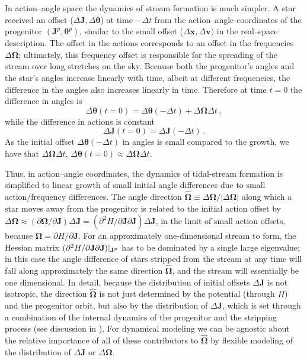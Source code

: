 \documentclass[12pt,preprint]{aastex}
\renewcommand{\vec}[1]{\ensuremath{\mathbf{#1}}}
\newcommand{\unitvec}[1]{\ensuremath{\mathbf{\hat{#1}}}}
\newcommand{\vecx}{\ensuremath{\vec{x}}}
\newcommand{\vecv}{\ensuremath{\vec{v}}}
\newcommand{\vecj}{\ensuremath{\vec{J}}}
\newcommand{\veco}{\ensuremath{\vec{\Omega}}}
\newcommand{\veca}{\ensuremath{\boldsymbol\theta}}
\begin{document}
In action--angle space the dynamics of stream formation is much
simpler. A star received an offset ($\Delta \vecj,\Delta \veca$) at
time $-\Delta t$ from the action--angle coordinates of the progenitor
$(\vecj^p,\veca^p)$, similar to the small offset ($\Delta \vecx,\Delta
\vecv)$ in the real--space description. The offset in the actions
corresponds to an offset in the frequencies $\Delta \veco$;
ultimately, this frequency offset is responsible for the spreading of
the stream over long stretches on the sky. Because both the
progenitor's angles and the star's angles increase linearly with time,
albeit at different frequencies, the difference in the angles also
increases linearly in time. Therefore at time $t=0$ the difference in
angles is
\begin{equation}
\Delta \veca(t=0) = \Delta \veca(-\Delta t) + \Delta \veco \Delta t\,,
\end{equation}
while the difference in actions is constant
\begin{equation}
\Delta \vecj(t=0) = \Delta \vecj(-\Delta t)\,.
\end{equation}
As the initial offset $\Delta \veca(-\Delta t)$ in angles is small
compared to the growth, we have that $\Delta\veco\Delta t$, $\Delta
\veca(t=0) \approx \Delta \veco \Delta t$.

Thus, in action--angle coordinates, the dynamics of tidal-stream
formation is simplified to linear growth of small initial angle
differences due to small action/frequency differences. The angle
direction $\unitvec{\veco} \equiv \Delta \veco / | \Delta \veco|$
along which a star moves away from the progenitor is related to the
initial action offset by $\Delta \veco \approx (\partial \veco /
\partial \vecj) \Delta \vecj = (\partial^2 H / \partial \vecj \partial
\vecj) \Delta \vecj$, in the limit of small action offsets, because
$\veco = \partial H / \partial \vecj$. For an approximately
one-dimensional stream to form, the Hessian matrix $(\partial^2 H /
\partial \vecj \partial \vecj)\large|_{\vecj^p}$ has to be dominated
by a single large eigenvalue; in this case the angle difference of
stars stripped from the stream at any time will fall along
approximately the same direction $\unitvec\veco$, and the stream will
essentially be one dimensional. In detail, because the distribution of
initial offsets $\Delta \vecj$ is not isotropic, the direction
$\unitvec \veco$ is not just determined by the potential (through $H$)
and the progenitor orbit, but also by the distribution of $\Delta
\vecj$, which is set through a combination of the internal dynamics of
the progenitor and the stripping process (see discussion in
\citealt{Sanders13b}). For dynamical modeling we can be agnostic about
the relative importance of all of these contributors to $\unitvec
\veco$ by flexible modeling of the distribution of $\Delta \vecj$ or
$\Delta \veco$.
\end{document}
